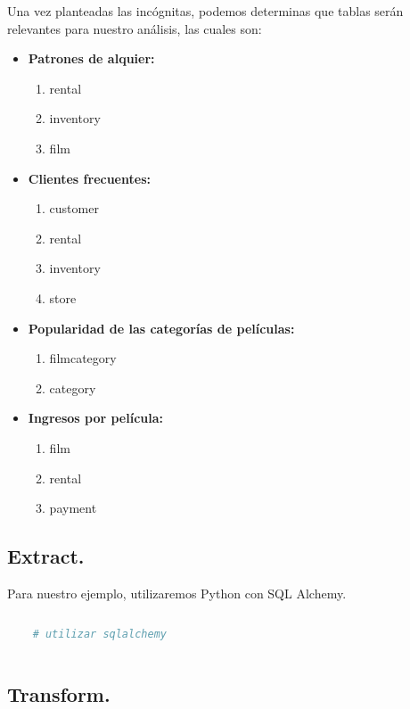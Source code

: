 \documentclass[12pt]{article}
\begin{document}
Una vez planteadas las incógnitas, podemos determinas que tablas serán relevantes para nuestro análisis, las cuales son:

\begin{itemize}
  \item \textbf{Patrones de alquier:}
  \begin{enumerate}
    \item rental
    \item inventory
    \item film
  \end{enumerate}
  \item \textbf{Clientes frecuentes:}
  \begin{enumerate}
    \item customer
    \item rental
    \item inventory
    \item store
  \end{enumerate}
  \item \textbf{Popularidad de las categorías de películas:}
  \begin{enumerate}
    \item film\textunderscore{}category
    \item category
  \end{enumerate}
  \item \textbf{Ingresos por película:}
  \begin{enumerate}
    \item film
    \item rental
    \item payment
  \end{enumerate}
\end{itemize}

\subsection{Extract.}

Para nuestro ejemplo, utilizaremos Python con SQL Alchemy.

\vspace{12pt}
\begin{lstlisting}[language=Python]
    
    # utilizar sqlalchemy
    
\end{lstlisting}
\vspace{12pt}

\subsection{Transform.}
\end{document}
